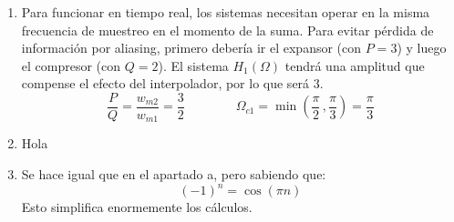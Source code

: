 \documentclass[a4paper,oneside]{book}
\begin{document}
{ %
	\begin{enumerate}[label=\alph*)]
		 \item Para funcionar en tiempo real, los sistemas necesitan operar en la misma frecuencia de muestreo en el momento de la suma. Para evitar pérdida de información por aliasing, primero debería ir el expansor (con $P=3$) y luego el compresor (con $Q=2$). El sistema $H_1(\Omega)$ tendrá una amplitud que compense el efecto del interpolador, por lo que será $3$. \[ \frac{P}{Q} = \frac{w_{m2}}{w_{m1}} = \frac{3}{2} \qquad \qquad \Omega_{c1} = \min \left( \frac{\pi}{2} \, , \frac{\pi}{3} \right) = \frac{\pi}{3}\]
		 \item Hola
		 \item Se hace igual que en el apartado a, pero sabiendo que: \[ (-1)^n = \cos \left( \pi n \right) \] Esto simplifica enormemente los cálculos.
	\end{enumerate}
}

\end{document}
